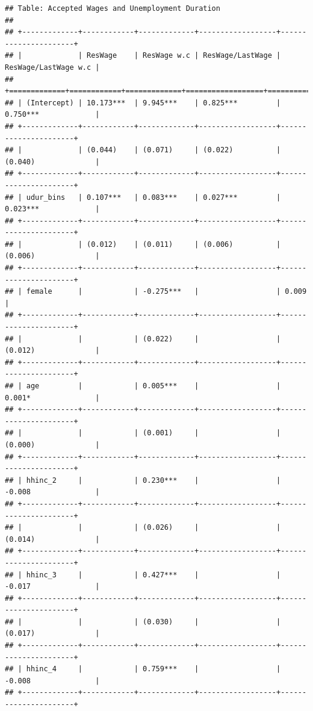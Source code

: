 \documentclass[
]{article}
\begin{document}
\begin{verbatim}
## Table: Accepted Wages and Unemployment Duration 
## 
## +-------------+------------+-------------+------------------+----------------------+
## |             | ResWage    | ResWage w.c | ResWage/LastWage | ResWage/LastWage w.c |
## +=============+============+=============+==================+======================+
## | (Intercept) | 10.173***  | 9.945***    | 0.825***         | 0.750***             |
## +-------------+------------+-------------+------------------+----------------------+
## |             | (0.044)    | (0.071)     | (0.022)          | (0.040)              |
## +-------------+------------+-------------+------------------+----------------------+
## | udur_bins   | 0.107***   | 0.083***    | 0.027***         | 0.023***             |
## +-------------+------------+-------------+------------------+----------------------+
## |             | (0.012)    | (0.011)     | (0.006)          | (0.006)              |
## +-------------+------------+-------------+------------------+----------------------+
## | female      |            | -0.275***   |                  | 0.009                |
## +-------------+------------+-------------+------------------+----------------------+
## |             |            | (0.022)     |                  | (0.012)              |
## +-------------+------------+-------------+------------------+----------------------+
## | age         |            | 0.005***    |                  | 0.001*               |
## +-------------+------------+-------------+------------------+----------------------+
## |             |            | (0.001)     |                  | (0.000)              |
## +-------------+------------+-------------+------------------+----------------------+
## | hhinc_2     |            | 0.230***    |                  | -0.008               |
## +-------------+------------+-------------+------------------+----------------------+
## |             |            | (0.026)     |                  | (0.014)              |
## +-------------+------------+-------------+------------------+----------------------+
## | hhinc_3     |            | 0.427***    |                  | -0.017               |
## +-------------+------------+-------------+------------------+----------------------+
## |             |            | (0.030)     |                  | (0.017)              |
## +-------------+------------+-------------+------------------+----------------------+
## | hhinc_4     |            | 0.759***    |                  | -0.008               |
## +-------------+------------+-------------+------------------+----------------------+

\end{verbatim}
\end{document}
